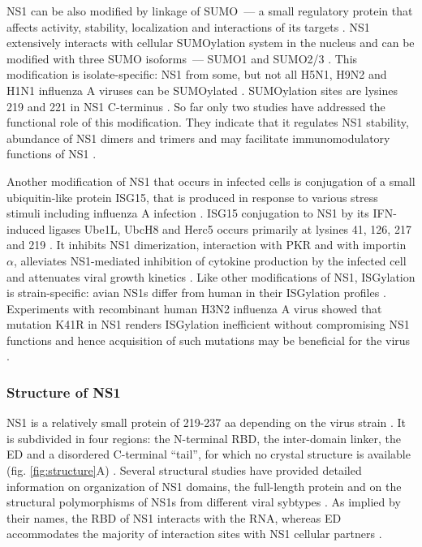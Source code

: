 		\gls{NS1} can be also modified by linkage of \gls{SUMO}~--- a small regulatory protein that affects activity, stability, localization and interactions of its targets \parencite{Johnson2004, Pal2010}. \gls{NS1} extensively interacts with cellular \gls{SUMO}ylation system in the nucleus and can be modified with three \gls{SUMO} isoforms~--- \gls{SUMO}1 and \gls{SUMO}2/3 \parencite{Pal2011, Santos2013}. This modification is isolate-specific: \gls{NS1} from some, but not all H5N1, H9N2 and H1N1 influenza A viruses can be \gls{SUMO}ylated \parencite{Xu2011}. \gls{SUMO}ylation sites are lysines 219 and 221 in NS1 C-terminus \parencite{Xu2011}. So far only two studies have addressed the functional role of this modification. They indicate that it regulates \gls{NS1} stability, abundance of \gls{NS1} dimers and trimers and may facilitate immunomodulatory functions of \gls{NS1} \parencite{Xu2011, Santos2013}. 
		
		Another modification of \gls{NS1} that occurs in infected cells is conjugation of a small ubiquitin-like protein \gls{ISG15}, that is produced in response to various stress stimuli including influenza A infection \parencite{Pitha-Rowe2007, Sadler2008, Hsiang2009}. \gls{ISG15} conjugation to \gls{NS1} by its \gls{IFN}-induced ligases Ube1L, UbcH8 and Herc5 occurs primarily at lysines 41, 126, 217 and 219 \parencite{Zhao2010, Tang2010a}. It inhibits \gls{NS1} dimerization, interaction with \gls{PKR} and with importin $\alpha$, alleviates \gls{NS1}-mediated inhibition of cytokine production by the infected cell and attenuates viral growth kinetics \parencite{Zhao2010, Tang2010a}. Like other modifications of \gls{NS1}, ISGylation is strain-specific: avian \gls{NS1}s differ from human in their ISGylation profiles \parencite{Tang2010a}. Experiments with recombinant human H3N2 influenza A virus showed that mutation K41R in NS1 renders ISGylation inefficient without compromising \gls{NS1} functions and hence acquisition of such mutations may be beneficial for the virus \parencite{Zhao2010}.
	
		
		\subsubsection{Structure of NS1}
		
		\gls{NS1} is a relatively small protein of 219-237 \gls{aa} depending on the virus strain \parencite{Hale2008b}. It is subdivided in four regions: the N-terminal \gls{RBD}, the inter-domain linker, the \gls{ED} and a disordered C-terminal ``tail'', for which no crystal structure is available (fig. \ref{fig:structure}A) \parencite{Hale2014}. Several structural studies have provided detailed information on organization of \gls{NS1} domains, the full-length protein and on the structural polymorphisms of \gls{NS1}s from different viral sybtypes \parencite{Chien1997, Liu1997, Wang1999a, Bornholdt2006, Yin2007a, Hale2008c, Cheng2009, Xia2009, Kerry2011, Carrillo2014}. As implied by their names, the \gls{RBD} of NS1 interacts with the RNA, whereas \gls{ED} accommodates the majority of interaction sites with \gls{NS1} cellular partners \parencite{Hale2008b}.
		
